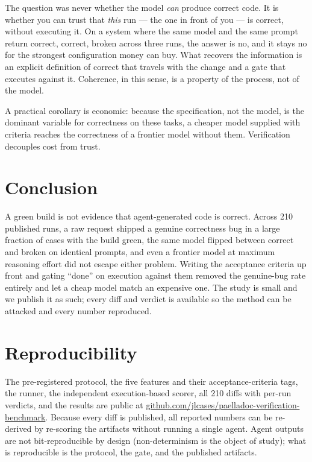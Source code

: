\documentclass[11pt]{article}
\newcommand{\repo}{\href{https://github.com/jlcases/paelladoc-verification-benchmark}{github.com/jlcases/paelladoc-verification-benchmark}}
\begin{document}
The question was never whether the model \emph{can} produce correct code. It is whether you can trust that \emph{this} run --- the one in front of you --- is correct, without executing it. On a system where the same model and the same prompt return correct, correct, broken across three runs, the answer is no, and it stays no for the strongest configuration money can buy. What recovers the information is an explicit definition of correct that travels with the change and a gate that executes against it. Coherence, in this sense, is a property of the process, not of the model.

A practical corollary is economic: because the specification, not the model, is the dominant variable for correctness on these tasks, a cheaper model supplied with criteria reaches the correctness of a frontier model without them. Verification decouples cost from trust.

\section{Conclusion}

A green build is not evidence that agent-generated code is correct. Across 210 published runs, a raw request shipped a genuine correctness bug in a large fraction of cases with the build green, the same model flipped between correct and broken on identical prompts, and even a frontier model at maximum reasoning effort did not escape either problem. Writing the acceptance criteria up front and gating ``done'' on execution against them removed the genuine-bug rate entirely and let a cheap model match an expensive one. The study is small and we publish it as such; every diff and verdict is available so the method can be attacked and every number reproduced.

\section*{Reproducibility}
The pre-registered protocol, the five features and their acceptance-criteria tags, the runner, the independent execution-based scorer, all 210 diffs with per-run verdicts, and the results are public at \repo. Because every diff is published, all reported numbers can be re-derived by re-scoring the artifacts without running a single agent. Agent outputs are not bit-reproducible by design (non-determinism is the object of study); what is reproducible is the protocol, the gate, and the published artifacts.
\end{document}
